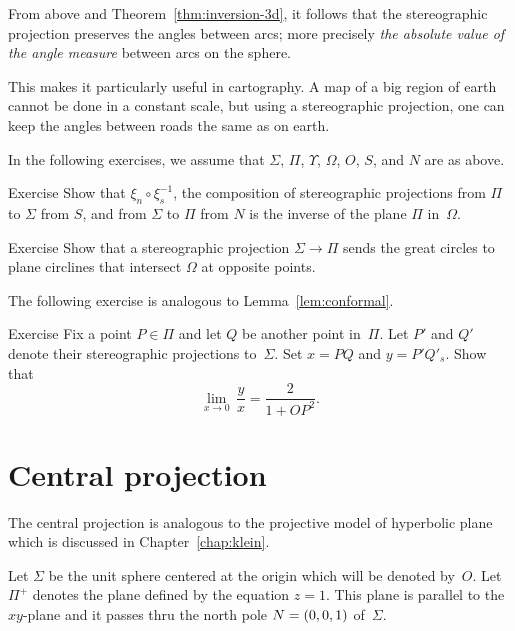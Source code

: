 From above and Theorem~\ref{thm:inversion-3d},
it follows that the stereographic projection preserves 
the angles between arcs;
more precisely {}\emph{the absolute value of the angle measure} between arcs on the sphere.

This makes it particularly useful in cartography.
A map of a big region of earth cannot be done in a constant scale,
but using a stereographic projection, one can keep the angles between roads the same as on earth.

In the following exercises,
we assume that $\Sigma$, $\Pi$, $\Upsilon$, $\Omega$, $O$, $S$, and $N$ are as above.
  
\begin{thm}{Exercise}\label{ex:two-stereographics}
Show that $\xi_n \circ \xi^{-1}_s$, the composition of stereographic projections 
from $\Pi$ to $\Sigma$ from  $S$, and
from $\Sigma$ to $\Pi$ from  $N$ is 
the inverse of the plane $\Pi$ in~$\Omega$.
\end{thm}

\begin{thm}{Exercise}\label{ex:great-circ}
Show that  a stereographic projection $\Sigma\to\Pi$
sends the great circles to plane circlines that intersect $\Omega$ at opposite points.
\end{thm}

The following exercise is analogous to Lemma~\ref{lem:conformal}.

\begin{thm}{Exercise}\label{ex:conform-sphere}
Fix a point $P\in \Pi$  and let $Q$ be another point in~$\Pi$.
Let $P'$ and $Q'$ denote their stereographic projections to~$\Sigma$.
Set $x=PQ$ and $y=P'Q'_s$.
Show that
$$\lim_{x\to 0}\, \frac{y}{x}=\frac{2}{1+OP^2}.$$
\end{thm}



\section*{Central projection}

The central projection is analogous to the projective model of hyperbolic plane which is discussed in Chapter~\ref{chap:klein}.

Let $\Sigma$ be the unit sphere centered at the origin which will be denoted by~$O$.
Let $\Pi^+$ denotes the plane defined by the equation $z=1$.
This plane is parallel to the $xy$-plane and it passes thru 
the north pole $N\z=(0,0,1)$ of~$\Sigma$.

